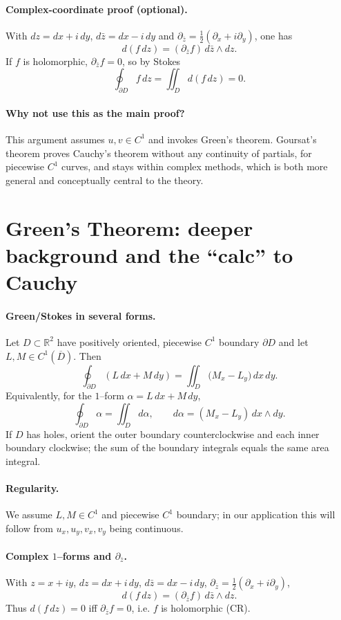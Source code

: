 \documentclass[11pt]{article}
\begin{document}
\paragraph{Complex-coordinate proof (optional).}
With $dz=dx+i\,dy$, $d\bar z=dx-i\,dy$ and
$\partial_{\bar z}=\tfrac12(\partial_x+i\partial_y)$,
one has
\[
d(f\,dz)=(\partial_{\bar z} f)\, d\bar z\wedge dz.
\]
If $f$ is holomorphic, $\partial_{\bar z}f=0$, so by Stokes
\[
\oint_{\partial D} f\,dz=\iint_D d(f\,dz)=0.
\]

\paragraph{Why not use this as the main proof?}
This argument assumes $u,v\in C^1$ and invokes Green’s theorem.
Goursat’s theorem proves Cauchy’s theorem without any continuity of
partials, for piecewise $C^1$ curves, and stays within complex methods,
which is both more general and conceptually central to the theory.

\section*{Green’s Theorem: deeper background and the ``calc'' to Cauchy}

\paragraph{Green/Stokes in several forms.}
Let $D\subset\mathbb R^2$ have positively oriented, piecewise $C^1$ boundary $\partial D$ and let
$L,M\in C^1(\overline D)$. Then
\[
\oint_{\partial D} (L\,dx+M\,dy)
=
\iint_D \big(M_x-L_y\big)\,dx\,dy.
\]
Equivalently, for the $1$--form $\alpha=L\,dx+M\,dy$,
\[
\oint_{\partial D}\alpha=\iint_D d\alpha,\qquad
d\alpha=(M_x-L_y)\,dx\wedge dy.
\]
If $D$ has holes, orient the outer boundary counterclockwise and each inner boundary clockwise;
the sum of the boundary integrals equals the same area integral.

\paragraph{Regularity.}
We assume $L,M\in C^1$ and piecewise $C^1$ boundary; in our application this will follow from
$u_x,u_y,v_x,v_y$ being continuous.

\paragraph{Complex $1$--forms and $\partial_{\bar z}$.}
With $z=x+iy$, $dz=dx+i\,dy$, $d\bar z=dx-i\,dy$, $\partial_{\bar z}=\tfrac12(\partial_x+i\partial_y)$,
\[
d(f\,dz)=(\partial_{\bar z}f)\,d\bar z\wedge dz.
\]
Thus $d(f\,dz)=0$ iff $\partial_{\bar z}f=0$, i.e. $f$ is holomorphic (CR).
\end{document}
